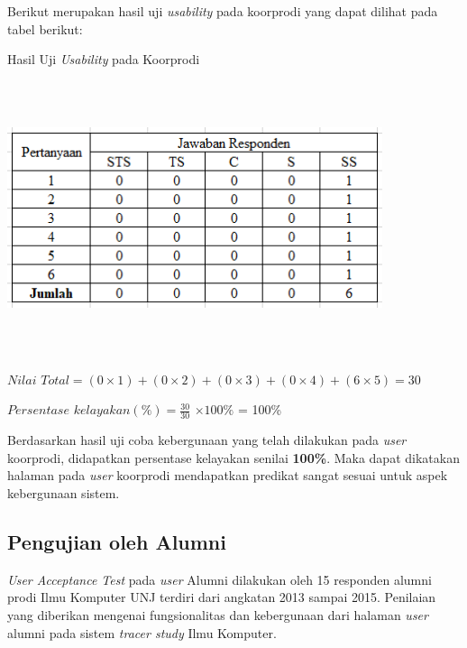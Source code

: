 \begin{enumerate}
	Berikut merupakan hasil uji \textit{usability} pada koorprodi yang dapat dilihat pada tabel berikut:
	
	\begin{table}[H]
		\centering
		\caption{Hasil Uji \textit{Usability} pada Koorprodi}
		\includegraphics[width=11cm,height=8cm]{gambar/UAT/hasil_u_koorprodi}
		\label{h_u_koorprodi}
	\end{table}
	
	$Nilai$ $Total = (0 \times 1) + (0 \times 2) + (0 \times 3) + (0 \times 4) + (6 \times 5) = 30$
	
	$Persentase$ $kelayakan (\%) = \frac{30}{30} $ $\times 100\%$ = 100\%

	Berdasarkan hasil uji coba kebergunaan yang telah dilakukan pada \textit{user} koorprodi, didapatkan persentase kelayakan senilai \textbf{100\%}. Maka dapat dikatakan halaman pada \textit{user} koorprodi mendapatkan predikat sangat sesuai untuk aspek kebergunaan sistem.
	
\end{enumerate}

\subsection{Pengujian oleh Alumni}
	\textit{User Acceptance Test} pada \textit{user} Alumni dilakukan oleh 15 responden alumni prodi Ilmu Komputer UNJ terdiri dari angkatan 2013 sampai 2015. Penilaian yang diberikan mengenai fungsionalitas dan kebergunaan dari halaman \textit{user} alumni pada sistem \textit{tracer study} Ilmu Komputer.

